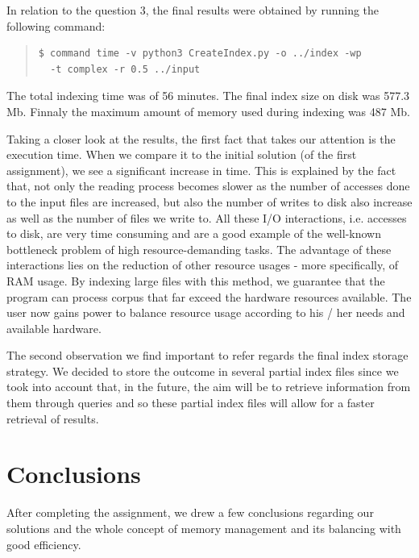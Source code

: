 \documentclass[12pt]{article}
\begin{document}
In relation to the question 3, the final results were obtained by running the 
following command:

\begingroup
\addtolength\leftmargini{-0.4in}
\addtolength\baselineskip{-0.05in}
\begin{quote}
\begin{verbatim}
$ command time -v python3 CreateIndex.py -o ../index -wp 
  -t complex -r 0.5 ../input
\end{verbatim}
\end{quote}
\endgroup

The total indexing time was of 56 minutes. The final index size on disk was 577.3 Mb.
Finnaly the maximum amount of memory used during indexing was 487 Mb.

Taking a closer look at the results, the first fact that takes our attention is the
execution time.
When we compare it to the initial solution (of the first assignment), we see a
significant increase in time.
This is explained by the fact that, not only the reading process becomes slower
as the number of accesses done to the input files are increased, but also the 
number of writes to disk also increase as well as the number of files we write to.
All these I/O interactions, i.e. accesses to disk, are very time consuming and 
are a good example of the well-known bottleneck problem of high resource-demanding tasks.
The advantage of these interactions lies on the reduction of other resource usages - 
more specifically, of RAM usage. 
By indexing large files with this method, we guarantee that the program can process
corpus that far exceed the hardware resources available.
The user now gains power to balance resource usage according to his / her needs and
available hardware.

The second observation we find important to refer regards the final index storage 
strategy. We decided to store the outcome in several partial index files since we
took into account that, in the future, the aim will be to retrieve information from
them through queries and so these partial index files will allow for a faster retrieval
of results.

\newpage
\section*{Conclusions}

After completing the assignment, we drew a few conclusions regarding our
solutions and the whole concept of memory management and its balancing with
good efficiency.
\end{document}
